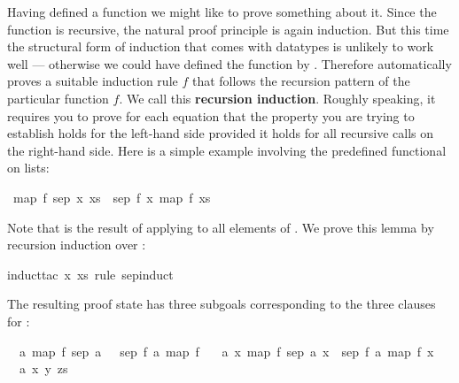 \begin{isabellebody}
\begin{isamarkuptext}
Having defined a function we might like to prove something about it.
Since the function is recursive, the natural proof principle is
again induction. But this time the structural form of induction that comes
with datatypes is unlikely to work well --- otherwise we could have defined the
function by . Therefore  automatically
proves a suitable induction rule $f$ that follows the
recursion pattern of the particular function $f$. We call this
\textbf{recursion induction}. Roughly speaking, it
requires you to prove for each  equation that the property
you are trying to establish holds for the left-hand side provided it holds
for all recursive calls on the right-hand side. Here is a simple example
involving the predefined  functional on lists:%
\end{isamarkuptext}%
\isamarkuptrue%
\isamarkupfalse%
\ {\isachardoublequoteopen}map\ f\ {\isacharparenleft}sep\ x\ xs{\isacharparenright}\ {\isacharequal}\ sep\ {\isacharparenleft}f\ x{\isacharparenright}\ {\isacharparenleft}map\ f\ xs{\isacharparenright}{\isachardoublequoteclose}%
\isadelimproof
%
\endisadelimproof
%
\isatagproof
%
\begin{isamarkuptxt}%
\noindent
Note that 
is the result of applying  to all elements of . We prove
this lemma by recursion induction over :%
\end{isamarkuptxt}%
\isamarkuptrue%
\isamarkupfalse%
{\isacharparenleft}induct{\isacharunderscore}tac\ x\ xs\ rule{\isacharcolon}\ sep{\isachardot}induct{\isacharparenright}%
\begin{isamarkuptxt}%
\noindent
The resulting proof state has three subgoals corresponding to the three
clauses for :
\begin{isabelle}%
\ {}{\isachardot}\ {\isasymAnd}a{\isachardot}\ map\ f\ {\isacharparenleft}sep\ a\ {\isacharbrackleft}{\isacharbrackright}{\isacharparenright}\ {\isacharequal}\ sep\ {\isacharparenleft}f\ a{\isacharparenright}\ {\isacharparenleft}map\ f\ {\isacharbrackleft}{\isacharbrackright}{\isacharparenright}\isanewline
\ {}{\isachardot}\ {\isasymAnd}a\ x{\isachardot}\ map\ f\ {\isacharparenleft}sep\ a\ {\isacharbrackleft}x{\isacharbrackright}{\isacharparenright}\ {\isacharequal}\ sep\ {\isacharparenleft}f\ a{\isacharparenright}\ {\isacharparenleft}map\ f\ {\isacharbrackleft}x{\isacharbrackright}{\isacharparenright}\isanewline
\ {}{\isachardot}\ {\isasymAnd}a\ x\ y\ zs{\isachardot}\isanewline

\end{isabelle}
\end{isamarkuptxt}
\end{isabellebody}
